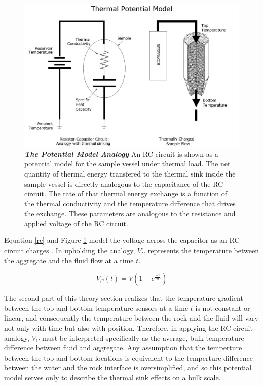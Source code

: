 \begin{figure}
\begin{center}
\includegraphics[scale=.35]{RCtherm.jpg}
\caption[Thermal Potential Model]{\textbf{\emph{The Potential Model Analogy}} An RC circuit is shown as a potential model for the sample vessel under thermal load. The net quantity of thermal energy transfered to the thermal sink inside the sample vessel is directly analogous to the capacitance of the RC circuit. The rate of that thermal energy exchange is a function of the thermal conductivity and the temperature difference that drives the exchange. These parameters are analogous to the resistance and applied voltage of the RC circuit.\label{rctherm}}
\end{center}
\end{figure}

Equation \ref{rc} and Figure \ref{rctherm} model the voltage across the capacitor as an RC \linebreak circuit charges \citep{elec}. In upholding the analogy, $V_{C}$ represents the temperature between the aggregate and the fluid flow at a time $t$. 

\begin{equation}\label{rc}
 V_{C}(t)=V(1-e^{\frac{-t}{RC}})
\end{equation}

The second part of this theory section realizes that the temperature gradient between the top and bottom temperature sensors at a time $t$ is not constant or linear, and consequently the temperature between the rock and the fluid will vary not only with time but also with position. Therefore, in applying the RC circuit analogy, $V_{C}$ must be interpreted specifically as the average, bulk temperature difference between fluid and aggregate. Any assumption that the temperture between the top and bottom locations is equivalent to the temperture difference between the water and the rock interface is oversimplified, and so this potential model serves only to describe the thermal sink effects on a bulk scale.

